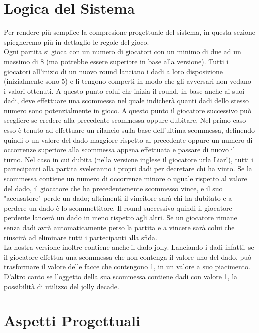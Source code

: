 \documentclass{llncs}
\begin{document}
	\section{Logica del Sistema}
		Per rendere più semplice la compresione progettuale del sistema, in questa sezione spiegheremo più in dettaglio le regole del gioco. \\
		Ogni partita si gioca con un numero di giocatori con un minimo di due ad un massimo di 8 (ma potrebbe essere superiore in base alla versione). Tutti i giocatori all'inizio di un nuovo round lanciano i dadi a loro disposizione (inizialmente sono 5) e li tengono comperti in modo che gli avversari non vedano i valori ottenuti. A questo punto colui che inizia il round, in base anche ai suoi dadi, deve effettuare una scommessa nel quale indicherà quanti dadi dello stesso numero sono potenzialmente in gioco. A questo punto il giocatore successivo può scegliere se credere alla precedente scommessa oppure dubitare. Nel primo caso esso è tenuto ad effettuare un rilancio sulla base dell'ultima scommessa, definendo quindi o un valore del dado maggiore rispetto al precedente oppure un numero di occorrenze superiore alla scommessa appena effettuata e passare di nuovo il turno. Nel caso in cui dubita (nella versione inglese il giocatore urla Liar!), tutti i partecipanti alla partita sveleranno i propri dadi per decretare chi ha vinto. Se la scommessa contiene un numero di occorrenze minore o uguale rispetto al valore del dado, il giocatore che ha precedentemente scommesso vince, e il suo "accusatore" perde un dado; altrimenti il vincitore sarà chi ha dubitato e a perdere un dado è lo scommettitore. Il round successivo quindi il giocatore perdente lancerà un dado in meno rispetto agli altri. Se un giocatore rimane senza dadi avrà automaticamente perso la partita e a vincere sarà colui che riuscirà ad eliminare tutti i partecipanti alla sfida.\\
		La nostra versione inoltre contiene anche il dado jolly. Lanciando i dadi infatti, se il giocatore effettua una scommessa che non contenga il valore uno del dado, può trasformare il valore delle facce che contengono 1, in un valore a suo piacimento. D'altro canto se l'oggetto della sua scommessa contiene dadi con valore 1, la possibilità di utilizzo del jolly decade.
	
	\section{Aspetti Progettuali}%
	
\end{document}
